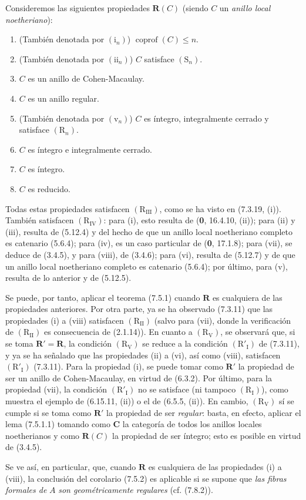 \begin{examples}[7.5.3]
\label{IV.2.s7.5.3-fr}
Consideremos las siguientes propiedades $\boldsymbol R(C)$ (siendo $C$ un \emph{anillo
local noetheriano}):
\begin{enumerate}
\item[(i)] (También denotada por $(\mathrm i_n)$)
$\operatorname{coprof}(C)\leq n$.
\item[(ii)] (También denotada por $(\mathrm{ii}_n)$) $C$
satisface $(\mathrm S_n)$.
\item[(iii)] $C$ es un anillo de Cohen-Macaulay.
\item[(iv)] $C$ es un anillo regular.
\item[(v)] (También denotada por $(\mathrm v_n)$) $C$ es íntegro,
integralmente cerrado y satisface $(\mathrm R_n)$.
\item[(vi)] $C$ es íntegro e integralmente cerrado.
\item[(vii)] $C$ es íntegro.
\item[(viii)] $C$ es reducido.
\end{enumerate}
Todas estas propiedades satisfacen $(\mathrm R_{\mathrm{III}})$,
como se ha visto en (7.3.19, (i)). También satisfacen
$(\mathrm R_{\mathrm{IV}})$: para (i), esto resulta de
(\textbf 0, 16.4.10, (ii)); para (ii) y (iii), resulta de (5.12.4) y del hecho
de que un anillo local noetheriano completo es catenario (5.6.4);
para (iv), es un caso particular de (\textbf 0, 17.1.8); para (vii), se deduce
de (3.4.5), y para (viii), de (3.4.6); para (vi), resulta de (5.12.7)
y de que un anillo local noetheriano completo es catenario (5.6.4);
por último, para (v), resulta de lo anterior y de (5.12.5).

Se puede, por tanto, aplicar el teorema (7.5.1) cuando $\boldsymbol R$
es cualquiera de las propiedades anteriores. Por otra parte, ya
se ha observado (7.3.11) que las propiedades (i) a (viii) satisfacen
$(\mathrm R_{\mathrm{II}})$ (salvo para (vii), donde la verificación de
$(\mathrm R_{\mathrm{II}})$ es consecuencia de (2.1.14)). En cuanto a
$(\mathrm R_{\mathrm V})$, se observará que, si se toma
$\boldsymbol R'=\boldsymbol R$, la condición
$(\mathrm R_{\mathrm V})$ se reduce a la condición
$(\mathrm R'_{\mathrm I})$ de (7.3.11), y ya se ha señalado que las
propiedades (ii) a (vi), así como (viii), satisfacen
$(\mathrm R'_{\mathrm I})$ (7.3.11). Para la propiedad (i), se puede
tomar como $\boldsymbol R'$ la propiedad de ser un anillo de
Cohen-Macaulay, en virtud de (6.3.2). Por último, para la propiedad
(vii), la condición $(\mathrm R'_{\mathrm I})$ no se satisface
(ni tampoco $(\mathrm R_{\mathrm I})$), como muestra el ejemplo de
(6.15.11, (ii)) o el de (6.5.5, (ii)). En cambio,
$(\mathrm R_{\mathrm V})$ sí se cumple si se toma como
$\boldsymbol R'$ la propiedad de ser \emph{regular}: basta, en efecto,
aplicar el lema (7.5.1.1) tomando como $\boldsymbol{C}$ la categoría de
todos los anillos locales noetherianos y como $\boldsymbol R(C)$ la
propiedad de ser íntegro; esto es posible en virtud de (3.4.5).

Se ve así, en particular, que, cuando $\boldsymbol R$ es cualquiera
de las propiedades (i) a (viii), la conclusión del corolario (7.5.2)
es aplicable si se supone que \emph{las fibras formales de} $A$ \emph{son
geométricamente regulares} (cf. (7.8.2)).
\end{examples}
